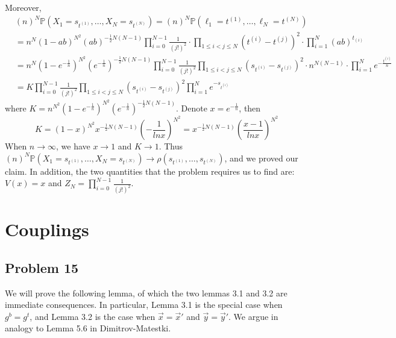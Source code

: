 \documentclass[12pt]{article}
\begin{document}
Moreover,
\begin{align*}
&(n)^{N}\mathbb{P}(X_{1}=s_{t^{(1)}},\dots,X_{N}=s_{t^{(N)}})=(n)^{N}\mathbb{P}(\ell_{1}=t^{(1)},\dots,\ell_{N}=t^{(N)})\\
&= n^{N}(1-ab)^{N^2}(ab)^{-\frac{1}{2}N(N-1)}\prod_{i=0}^{N-1} \frac{1}{(j!)^{2}}\cdot \prod_{1\leqslant i<j\leqslant N}(t^{(i)}-t^{(j)})^{2}\cdot\prod_{i=1}^{N}(ab)^{t_{(i)}}\\
&= n^{N}(1-e^{-\frac{1}{n}})^{N^2}(e^{-\frac{1}{n}})^{-\frac{1}{2}N(N-1)}\prod_{i=0}^{N-1}\frac{1}{(j!)^2}\prod_{1\leqslant i<j\leqslant N}(s_{t^{(i)}}-s_{t^{(j)}})^{2}\cdot n^{N(N-1)}\cdot\prod_{i=1}^{N}e^{-\frac{t^{(i)}}{n}}\\
&= K \prod_{i=0}^{N-1}\frac{1}{(j!)^2}\prod_{1\leqslant i<j\leqslant N}(s_{t^{(i)}}-s_{t^{(j)}})^{2}\prod_{i=1}^{N}e^{-s_{t^{(i)}}}
\end{align*}
where $K=n^{N^2}(1-e^{-\frac{1}{n}})^{N^2}(e^{-\frac{1}{n}})^{-\frac{1}{2}N(N-1)}$. Denote $x=e^{-\frac{1}{n}}$, then $$K=(1-x)^{N^2}x^{-\frac{1}{2}N(N-1)}(-\frac{1}{lnx})^{N^2}=x^{-\frac{1}{2}N(N-1)}(\frac{x-1}{lnx})^{N^2}$$ When $n\rightarrow\infty$, we have $x\rightarrow 1$ and $K\rightarrow 1$. Thus $(n)^{N}\mathbb{P}(X_{1}=s_{t^{(1)}},\dots,X_{N}=s_{t^{(N)}})\rightarrow\rho(s_{t^{(1)}},\dots,s_{t^{(N)}})$, and we proved our claim. In addition, the two quantities that the problem requires us to find are: $V(x)=x$ and $Z_{N}=\prod_{i=0}^{N-1}\frac{1}{(j!)^2}$.


\section{Couplings}

	\subsection*{Problem 15}
	
	We will prove the following lemma, of which the two lemmas 3.1 and 3.2 are immediate consequences. In particular, Lemma 3.1 is the special case when $g^b = g^t$, and Lemma 3.2 is the case when $\vec{x} = \vec{x}'$ and $\vec{y} = \vec{y}'$. We argue in analogy to Lemma 5.6 in Dimitrov-Matestki.
	
\end{document}

